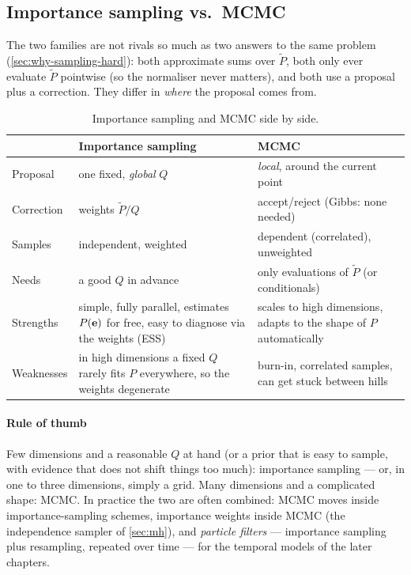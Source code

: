 \documentclass[11pt, oneside]{book}
\let\originalsubsection\subsection
\renewcommand{\subsection}{\Needspace{6\baselineskip}\originalsubsection}
\begin{document}
\subsection{Importance sampling vs.\ MCMC}

The two families are not rivals so much as two answers to the same problem
(\cref{sec:why-sampling-hard}): both approximate sums over $\tilde P$, both
only ever evaluate $\tilde P$ pointwise (so the normaliser never matters),
and both use a proposal plus a correction. They differ in \emph{where} the
proposal comes from.

\begin{table}[htbp]
\centering
\small
\renewcommand{\arraystretch}{1.3}
\begin{tabular}{@{}>{\raggedright\arraybackslash}p{2.6cm}>{\raggedright\arraybackslash}p{5.6cm}>{\raggedright\arraybackslash}p{5.6cm}@{}}
\toprule
& \textbf{Importance sampling} & \textbf{MCMC} \\
\midrule
Proposal & one fixed, \emph{global} $Q$ & \emph{local}, around the current point \\
Correction & weights $\tilde P/Q$ & accept/reject (Gibbs: none needed) \\
Samples & independent, weighted & dependent (correlated), unweighted \\
Needs & a good $Q$ in advance & only evaluations of $\tilde P$ (or conditionals) \\
Strengths & simple, fully parallel, estimates $P(\mathbf{e})$ for free, easy to diagnose via the weights (ESS) & scales to high dimensions, adapts to the shape of $P$ automatically \\
Weaknesses & in high dimensions a fixed $Q$ rarely fits $P$ everywhere, so the weights degenerate & burn-in, correlated samples, can get stuck between hills \\
\bottomrule
\end{tabular}
\caption{Importance sampling and MCMC side by side.}
\label{tab:is-vs-mcmc}
\end{table}

\paragraph{Rule of thumb} Few dimensions and a reasonable $Q$ at hand (or a
prior that is easy to sample, with evidence that does not shift things too
much): importance sampling --- or, in one to three dimensions, simply a grid.
Many dimensions and a complicated shape: MCMC. In practice the two are often
combined: MCMC moves inside importance-sampling schemes, importance weights
inside MCMC (the independence sampler of \cref{sec:mh}), and \emph{particle
filters} --- importance sampling plus resampling, repeated over time --- for
the temporal models of the later chapters.
\end{document}
